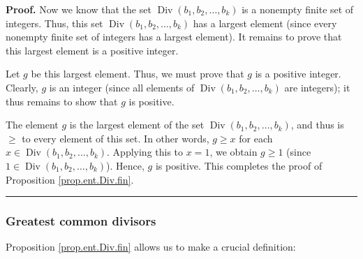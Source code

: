 \documentclass[numbers=enddot,12pt,final,onecolumn,notitlepage]{scrartcl}%
\numberwithin{exer}{subsection}
\theoremstyle{definition}
\newenvironment{proof}[1][Proof]{\noindent\textbf{#1.} }{\ \rule{0.5em}{0.5em}}
\begin{document}
\begin{proof}
Now we know that the set $\operatorname*{Div}\left(  b_{1},b_{2},\ldots
,b_{k}\right)  $ is a nonempty finite set of integers. Thus, this set
$\operatorname*{Div}\left(  b_{1},b_{2},\ldots,b_{k}\right)  $ has a largest
element (since every nonempty finite set of integers has a largest element).
It remains to prove that this largest element is a positive integer.

Let $g$ be this largest element. Thus, we must prove that $g$ is a positive
integer. Clearly, $g$ is an integer (since all elements of
$\operatorname*{Div}\left(  b_{1},b_{2},\ldots,b_{k}\right)  $ are integers);
it thus remains to show that $g$ is positive.

The element $g$ is the largest element of the set $\operatorname*{Div}\left(
b_{1},b_{2},\ldots,b_{k}\right)  $, and thus is $\geq$ to every element of
this set. In other words, $g\geq x$ for each $x\in\operatorname*{Div}\left(
b_{1},b_{2},\ldots,b_{k}\right)  $. Applying this to $x=1$, we obtain $g\geq1$
(since $1\in\operatorname*{Div}\left(  b_{1},b_{2},\ldots,b_{k}\right)  $).
Hence, $g$ is positive. This completes the proof of Proposition
\ref{prop.ent.Div.fin}.
\end{proof}

\subsubsection{Greatest common divisors}

Proposition \ref{prop.ent.Div.fin} allows us to make a crucial definition:
\end{document}
